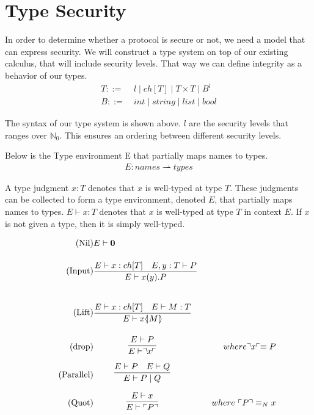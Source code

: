 \section{Type Security}
In order to determine whether a protocol is secure or not, we need a model that can express security.
We will construct a type system on top of our existing calculus, that will include security levels.
That way we can define integrity as a behavior of our types.
\begin{align*}
	T::=\ &l\mid ch[T]\mid T\times T\mid B^l\\
	B::=\ &int\mid string\mid list\mid bool
\end{align*}

\noindent The syntax of our type system is shown above.
$l$ are the security levels that ranges over $\mathbb{N}_0$.
This ensures an ordering between different security levels.

Below is the Type environment E that partially maps names to types.
\begin{align*}
E: names \rightharpoonup types
\end{align*}

\noindent A type judgment $x:T$ denotes that $x$ is well-typed at type $T$.
These judgments can be collected to form a type environment, denoted $E$, that partially maps names to types.
$E\vdash x:T$ denotes that $x$ is well-typed at type $T$ in context $E$.
If $x$ is not given a type, then it is simply well-typed.


\begin{align}
\tag{Nil} &E \vdash \nil\\
\tag{Input} &\infrule{E\vdash x:ch[T]\quad E,y:T\vdash P}{E \vdash \inp{x}{y}P}\\
\tag{Lift} &\infrule{E\vdash x:ch[T]\quad E \vdash M:T}{E\vdash \lift{x}{M}}\\
\tag{drop} &\infrule{E \vdash P}{E\vdash \drop{x}}& where \drop{x} \equiv P\\
\tag{Parallel} &\infrule{E\vdash P \quad E \vdash Q}{E \vdash P \para Q}\\
\tag{Quot} &\infrule{E \vdash x}{E\vdash \quot{P}}& where\ \quot{P} \equiv_N x
\end{align}

